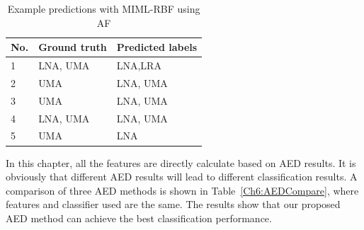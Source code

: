 \begin{table}[htb!]
\centering
\caption{Example predictions with MIML-RBF using AF}
\label{tab:prediction}
\begin{tabular}{lll}
\hline\hline
{\bf No.} &{\bf Ground truth} & {\bf Predicted labels} \\ \hline
1&LNA, UMA                & LNA,LRA                    \\ 
2&UMA      &     LNA, UMA      \\ 
3& UMA           & LNA, UMA               \\ 
4&LNA, UMA      & LNA, UMA     \\ 
5&UMA      & LNA            \\ \hline\hline
\end{tabular}
\end{table}


In this chapter, all the features are directly calculate based on AED results.
It is obviously that different AED results will lead to different classification results. 
A comparison of three AED methods is shown in Table~\ref{Ch6:AEDCompare}, where features and classifier used are the same. The results show that our proposed AED method can achieve the best classification performance.





